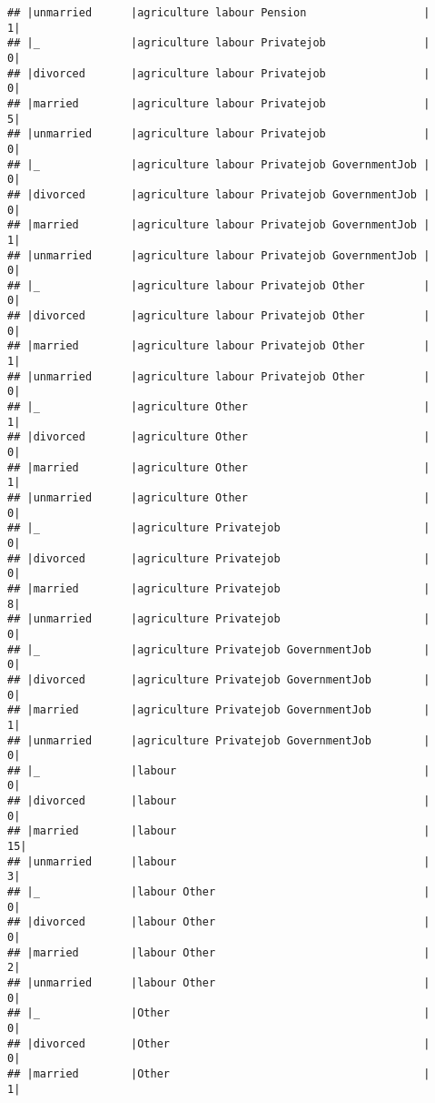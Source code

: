 \documentclass[
]{article}
\begin{document}
\begin{verbatim}
## |unmarried      |agriculture labour Pension                  |     1|
## |_              |agriculture labour Privatejob               |     0|
## |divorced       |agriculture labour Privatejob               |     0|
## |married        |agriculture labour Privatejob               |     5|
## |unmarried      |agriculture labour Privatejob               |     0|
## |_              |agriculture labour Privatejob GovernmentJob |     0|
## |divorced       |agriculture labour Privatejob GovernmentJob |     0|
## |married        |agriculture labour Privatejob GovernmentJob |     1|
## |unmarried      |agriculture labour Privatejob GovernmentJob |     0|
## |_              |agriculture labour Privatejob Other         |     0|
## |divorced       |agriculture labour Privatejob Other         |     0|
## |married        |agriculture labour Privatejob Other         |     1|
## |unmarried      |agriculture labour Privatejob Other         |     0|
## |_              |agriculture Other                           |     1|
## |divorced       |agriculture Other                           |     0|
## |married        |agriculture Other                           |     1|
## |unmarried      |agriculture Other                           |     0|
## |_              |agriculture Privatejob                      |     0|
## |divorced       |agriculture Privatejob                      |     0|
## |married        |agriculture Privatejob                      |     8|
## |unmarried      |agriculture Privatejob                      |     0|
## |_              |agriculture Privatejob GovernmentJob        |     0|
## |divorced       |agriculture Privatejob GovernmentJob        |     0|
## |married        |agriculture Privatejob GovernmentJob        |     1|
## |unmarried      |agriculture Privatejob GovernmentJob        |     0|
## |_              |labour                                      |     0|
## |divorced       |labour                                      |     0|
## |married        |labour                                      |    15|
## |unmarried      |labour                                      |     3|
## |_              |labour Other                                |     0|
## |divorced       |labour Other                                |     0|
## |married        |labour Other                                |     2|
## |unmarried      |labour Other                                |     0|
## |_              |Other                                       |     0|
## |divorced       |Other                                       |     0|
## |married        |Other                                       |     1|

\end{verbatim}
\end{document}
